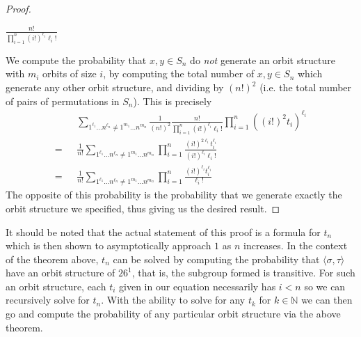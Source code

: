 \begin{proof}
\begin{center}
		$\frac{n!}{\prod_{i=1}^n{(i!)^{\ell_i}\ell_i!}}$
	\end{center}
	We compute the probability that $x,y\in S_n$ do \emph{not} generate an orbit structure with $m_i$ orbits of size $i$, by computing the total number of $x,y\in S_n$ which generate any other orbit structure, and dividing by $(n!)^2$ (i.e. the total number of pairs of permutations in $S_n$). This is precisely
	\begin{align*}
		          & \sum_{1^{\ell_1}\dots n^{\ell_n} \ne 1^{m_1}\dots n^{m_n}}{\frac{1}{(n!)^2}\frac{n!}{\prod_{i=1}^n{(i!)^{\ell_i}\ell_i!}}}\prod_{i=1}^n{((i!)^2t_i)^{\ell_i}} \\
		=\text{ } & \frac{1}{n!}\sum_{1^{\ell_1}\dots n^{\ell_n} \ne 1^{m_1}\dots n^{m_n}}{\prod_{i=1}^n{\frac{(i!)^{2\ell_i}t_i^{\ell_i}}{(i!)^{\ell_i}\ell_i!}}}                \\
		=\text{ } & \frac{1}{n!}\sum_{1^{\ell_1}\dots n^{\ell_n} \ne 1^{m_1}\dots n^{m_n}}{\prod_{i=1}^n{\frac{(i!)^{\ell_i}t_i^{\ell_i}}{
		\ell_i!}}}
	\end{align*}
	The opposite of this probability is the probability that we generate exactly the orbit structure we specified, thus giving us the desired result.
\end{proof}
\noindent It should be noted that the actual statement of this proof is a formula for $t_n$ which is then shown to asymptotically approach $1$ as $n$ increases. In the context of the theorem above, $t_n$ can be solved by computing the probability that $\langle \sigma, \tau\rangle$ have an orbit structure of $26^1$, that is, the subgroup formed is transitive. For such an orbit structure, each $t_i$ given in our equation necessarily has $i < n$ so we can recursively solve for $t_n$. With the ability to solve for any $t_k$ for $k\in\mathbb{N}$ we can then go and compute the probability of any particular orbit structure via the above theorem.
